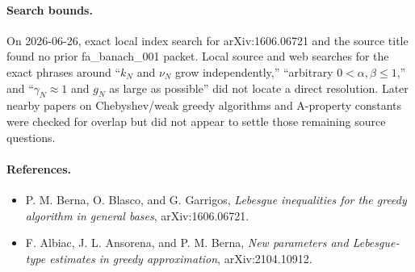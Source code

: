 \documentclass[11pt]{article}
\begin{document}
\paragraph{Search bounds.}
On 2026-06-26, exact local index search for arXiv:1606.06721 and the source
title found no prior fa\_banach\_001 packet.  Local source and web searches for
the exact phrases around ``$k_N$ and $\nu_N$ grow independently,'' ``arbitrary
$0<\alpha,\beta\le 1$,'' and ``$\gamma_N\approx1$ and $g_N$ as large as possible''
did not locate a direct resolution.  Later nearby papers on Chebyshev/weak
greedy algorithms and A-property constants were checked for overlap but did
not appear to settle those remaining source questions.

\paragraph{References.}
\begin{itemize}
  \item P. M. Berna, O. Blasco, and G. Garrigos,
  \emph{Lebesgue inequalities for the greedy algorithm in general bases},
  arXiv:1606.06721.
  \item F. Albiac, J. L. Ansorena, and P. M. Berna,
  \emph{New parameters and Lebesgue-type estimates in greedy approximation},
  arXiv:2104.10912.
\end{itemize}
\end{document}
